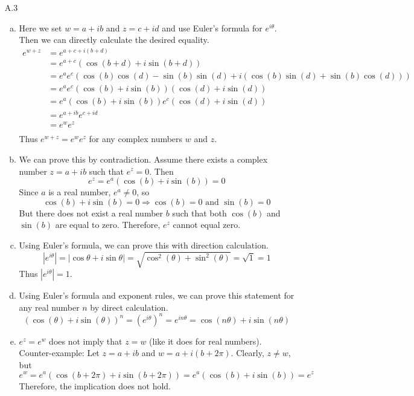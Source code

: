 \documentclass[../../Solutions.tex]{subfiles}
\begin{document}
\begin{itemize}
	\item [A.3] 
		\begin{enumerate}[(a)]
			\item Here we set $w = a+ib$ and $z = c+id$ and use Euler's formula for $e^{i\theta}$.
			Then we can directly calculate the desired equality.
			\begin{equation*} \begin{split}
				e^{w+z} & = e^{a+c+i(b+d)} \\
						& = e^{a+c}(\cos(b+d)+i\sin(b+d)) \\
						& = e^ae^c(\cos(b)\cos(d)-\sin(b)\sin(d)+i(\cos(b)\sin(d)+\sin(b)\cos(d))) \\
						& = e^ae^c(\cos(b)+i\sin(b))(\cos(d)+i\sin(d)) \\
						& = e^a(\cos(b)+i\sin(b))e^c(\cos(d)+i\sin(d)) \\
						& = e^{a+ib}e^{c+id} \\
						& = e^we^z \\
			\end{split} \end{equation*}
			Thus $e^{w+z}=e^we^z$ for any complex numbers $w$ and $z$.
			
			\item We can prove this by contradiction.
			Assume there exists a complex number $z = a+ib$ such that $e^z=0$.
			Then
			$$ e^z = e^a(\cos(b)+i\sin(b)) = 0 $$
			Since $a$ is a real number, $e^a \neq 0$, so
			$$ \cos(b)+i\sin(b) = 0 \Rightarrow \cos(b) = 0 \text{ and } \sin(b) = 0 $$
			But there does not exist a real number $b$ such that both $\cos(b)$ and $\sin(b)$ are equal to zero.
			Therefore, $e^z$ cannot equal zero.
			
			\item Using Euler's formula, we can prove this with direction calculation.
			\begin{equation*}
			|e^{i\theta}| = |\cos{\theta}+i\sin{\theta}| = \sqrt{ \cos^2(\theta)+\sin^2(\theta) } = \sqrt{1} = 1
			\end{equation*}
			Thus $|e^{i\theta}| = 1$.
			
			\item Using Euler's formula and exponent rules, we can prove this statement for any real number $n$ by direct calculation.
			$$ (\cos(\theta)+i\sin(\theta))^n = (e^{i\theta})^n = e^{in\theta} = \cos(n\theta)+i\sin(n\theta) $$
			
			\item $e^z = e^w$ does not imply that $z = w$ (like it does for real numbers).
			Counter-example: Let $z = a+ib$ and $w = a+i(b+2\pi)$.
			Clearly, $z \neq w$, but
			$$ e^w = e^a(\cos(b+2\pi)+i\sin(b+2\pi)) = e^a(\cos(b)+i\sin(b)) = e^z $$
			Therefore, the implication does not hold.
		\end{enumerate}
	

\end{itemize}
\end{document}
